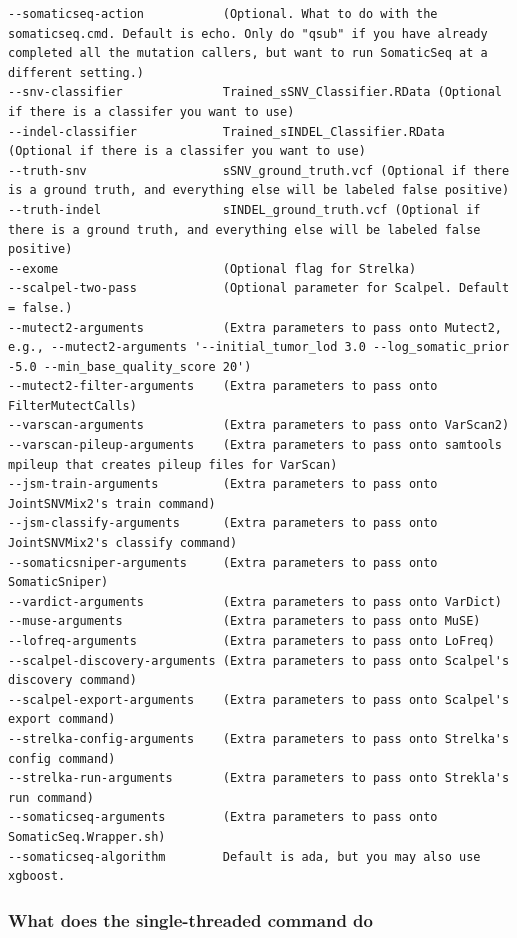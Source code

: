 \documentclass[10pt,letterpaper]{article}
\begin{document}
\begin{sloppypar}
\begin{lstlisting}
--somaticseq-action           (Optional. What to do with the somaticseq.cmd. Default is echo. Only do "qsub" if you have already completed all the mutation callers, but want to run SomaticSeq at a different setting.)
--snv-classifier              Trained_sSNV_Classifier.RData (Optional if there is a classifer you want to use)
--indel-classifier            Trained_sINDEL_Classifier.RData (Optional if there is a classifer you want to use)
--truth-snv                   sSNV_ground_truth.vcf (Optional if there is a ground truth, and everything else will be labeled false positive)
--truth-indel                 sINDEL_ground_truth.vcf (Optional if there is a ground truth, and everything else will be labeled false positive)
--exome                       (Optional flag for Strelka)
--scalpel-two-pass            (Optional parameter for Scalpel. Default = false.)
--mutect2-arguments           (Extra parameters to pass onto Mutect2, e.g., --mutect2-arguments '--initial_tumor_lod 3.0 --log_somatic_prior -5.0 --min_base_quality_score 20')
--mutect2-filter-arguments    (Extra parameters to pass onto FilterMutectCalls)
--varscan-arguments           (Extra parameters to pass onto VarScan2)
--varscan-pileup-arguments    (Extra parameters to pass onto samtools mpileup that creates pileup files for VarScan)
--jsm-train-arguments         (Extra parameters to pass onto JointSNVMix2's train command)
--jsm-classify-arguments      (Extra parameters to pass onto JointSNVMix2's classify command)
--somaticsniper-arguments     (Extra parameters to pass onto SomaticSniper)
--vardict-arguments           (Extra parameters to pass onto VarDict)
--muse-arguments              (Extra parameters to pass onto MuSE)
--lofreq-arguments            (Extra parameters to pass onto LoFreq)
--scalpel-discovery-arguments (Extra parameters to pass onto Scalpel's discovery command)
--scalpel-export-arguments    (Extra parameters to pass onto Scalpel's export command)
--strelka-config-arguments    (Extra parameters to pass onto Strelka's config command)
--strelka-run-arguments       (Extra parameters to pass onto Strekla's run command)
--somaticseq-arguments        (Extra parameters to pass onto SomaticSeq.Wrapper.sh)
--somaticseq-algorithm        Default is ada, but you may also use xgboost.
\end{lstlisting}



\subsubsection{What does the single-threaded command do}


\end{sloppypar}
\end{document}
